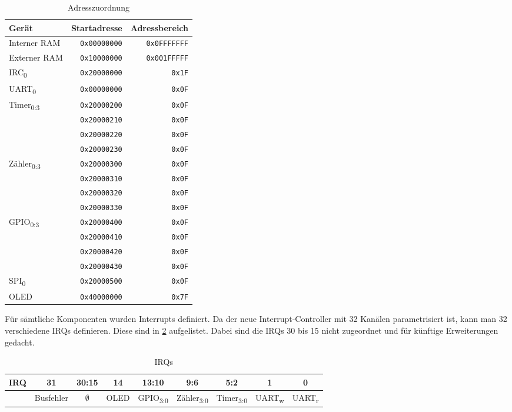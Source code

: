 \begin{table}[!htbp]
	\bigskip
	\centering
	\begin{tabular}{ l | r | r }
		\textbf{Gerät} & \textbf{Startadresse} & \textbf{Adressbereich} \\
		\hline		
		Interner \gls{RAM} & \texttt{0x00000000} & \texttt{0x0FFFFFFF} \\
		Externer \gls{RAM} & \texttt{0x10000000} & \texttt{0x001FFFFF} \\
		\hline		
		IRC\textsubscript{0} & \texttt{0x20000000} & \texttt{0x1F} \\
		\hline		
		UART\textsubscript{0}& \texttt{0x00000000} & \texttt{0x0F} \\
		\hline
		\multirow{4}{*}{Timer\textsubscript{0:3}} & \texttt{0x20000200} & \texttt{0x0F} \\
		& \texttt{0x20000210} & \texttt{0x0F} \\
		& \texttt{0x20000220} & \texttt{0x0F} \\
		& \texttt{0x20000230} & \texttt{0x0F} \\
		\hline
		\multirow{4}{*}{Zähler\textsubscript{0:3}} & \texttt{0x20000300} & \texttt{0x0F} \\
		& \texttt{0x20000310} & \texttt{0x0F} \\
		& \texttt{0x20000320} & \texttt{0x0F} \\
		& \texttt{0x20000330} & \texttt{0x0F} \\
		\hline
		\multirow{4}{*}{GPIO\textsubscript{0:3}}  & \texttt{0x20000400} & \texttt{0x0F} \\
		& \texttt{0x20000410} & \texttt{0x0F} \\
		& \texttt{0x20000420} & \texttt{0x0F} \\
		& \texttt{0x20000430} & \texttt{0x0F} \\
		\hline
		SPI\textsubscript{0} & \texttt{0x20000500} & \texttt{0x0F} \\
		\hline
		OLED & \texttt{0x40000000} & \texttt{0x7F} \\
		\hline
	\end{tabular}
	
	\caption{Adresszuordnung}
	\label{tab:address_map}
\end{table}

Für sämtliche Komponenten wurden Interrupts definiert. Da der neue Interrupt-Controller mit 32 Kanälen parametrisiert ist, kann man 32 verschiedene \glspl{IRQ} definieren. Diese sind in \cref{tab:interrupts} aufgelistet. Dabei sind die \glspl{IRQ} 30 bis 15 nicht zugeordnet und für künftige Erweiterungen gedacht.

\begin{table}[!htbp]
	\bigskip
	\centering
	\begin{tabular}{ l | c | c | c | c | c | c | c | c }
		\textbf{\gls{IRQ}} & 31 & 30:15 & 14 & 13:10 & 9:6 & 5:2 & 1 & 0 \\
		\hline
		& Busfehler & $\emptyset$ & OLED & GPIO\textsubscript{3:0} & Zähler\textsubscript{3:0} & Timer\textsubscript{3:0} & UART\textsubscript{w} & UART\textsubscript{r} \\
		\hline
	\end{tabular}
	
	\caption{\glspl{IRQ}}
	\label{tab:interrupts}
\end{table}